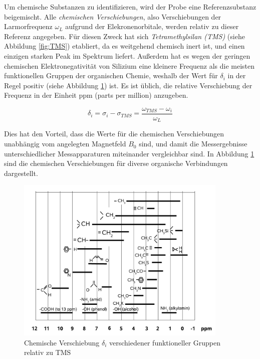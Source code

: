 \documentclass[a4paper]{scrartcl} %
\begin{document}
Um chemische Substanzen zu identifizieren, wird der Probe eine Referenzsubstanz beigemischt. Alle \emph{chemischen Verschiebungen}, also Verschiebungen der Larmorfrequenz $\omega_{L}$ aufgrund der Elekronenorbitale, werden relativ zu dieser Referenz angegeben. Für diesen Zweck hat sich \emph{Tetramethylsilan (TMS)} \autocite{TMS} (siehe Abbildung \ref{fig:TMS}) etabliert, da es weitgehend chemisch inert ist, und einen einzigen starken Peak im Spektrum liefert. Außerdem hat es wegen der geringen chemischen Elektronegativität von Silizium eine kleinere Frequenz als die meisten funktionellen Gruppen der organischen Chemie, weshalb der Wert für $\delta_i$ in der Regel positiv (siehe Abbildung \ref{fig:chem_shift}) ist. Es ist üblich, die relative Verschiebung der Frequenz in der Einheit ppm (parts per million) anzugeben.

\begin{equation}
	\delta_i = \sigma_i -\sigma_{TMS} = \frac{\omega_{TMS} - \omega_i}{\omega_L}
	\label{eq:delta_i}
\end{equation}

Dies hat den Vorteil, dass die Werte für die chemischen Verschiebungen unabhängig vom angelegten Magnetfeld $B_0$ sind, und damit die Messergebnisse unterschiedlicher Messapparaturen miteinander vergleichbar sind.
In Abbildung \ref{fig:chem_shift} sind die chemischen Verschiebungen für diverse organische Verbindungen dargestellt.

\begin{figure}[htbp]
	\centering
	\includegraphics[width= 0.9\textwidth]{./Resources/chem_shifts.png}
	\caption{Chemische Verschiebung $\delta_i$ verschiedener funktioneller Gruppen relativ zu TMS \autocite{skript}}
	\label{fig:chem_shift}
\end{figure}
\end{document}
